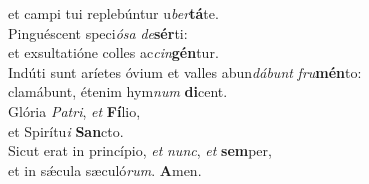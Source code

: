 \evenverse et campi tui replebúntur u\textit{ber}\textbf{tá}te.\\
\oddverse Pinguéscent speci\textit{ó}\textit{sa} \textit{de}\textbf{sér}ti:~\*\\
\oddverse et exsultatióne colles ac\textit{cin}\textbf{gén}tur.\\
\evenverse Indúti sunt aríetes óvium et valles abun\textit{dá}\textit{bunt} \textit{fru}\textbf{mén}to:~\*\\
\evenverse clamábunt, étenim hym\textit{num} \textbf{di}cent.\\
\oddverse Glória \textit{Pa}\textit{tri}, \textit{et} \textbf{Fí}lio,~\*\\
\oddverse et Spirítu\textit{i} \textbf{San}cto.\\
\evenverse Sicut erat in princípio, \textit{et} \textit{nunc}, \textit{et} \textbf{sem}per,~\*\\
\evenverse et in sǽcula sæculó\textit{rum}. \textbf{A}men.\\
